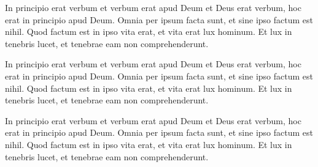 \documentclass{scrbook}
\begin{document}
\beginnumbering
\pstart
In principio erat verbum et verbum erat apud Deum et Deus erat verbum, hoc erat in principio apud Deum. Omnia per ipsum facta sunt, et sine ipso factum est nihil. Quod factum est in ipso vita erat, et vita erat lux hominum. Et lux in tenebris lucet, et tenebrae eam non comprehenderunt.
\pend

\pstart[\vskip \baselineskip{\hfill ***\hfill\strut}\vskip \baselineskip]
In principio erat verbum et verbum erat apud Deum et Deus erat verbum, hoc erat in principio apud Deum. Omnia per ipsum facta sunt, et sine ipso factum est nihil. Quod factum est in ipso vita erat, et vita erat lux hominum. Et lux in tenebris lucet, et tenebrae eam non comprehenderunt.
\pend

\pstart
In principio erat verbum et verbum erat apud Deum et Deus erat verbum, hoc erat in principio apud Deum. Omnia per ipsum facta sunt, et sine ipso factum est nihil. Quod factum est in ipso vita erat, et vita erat lux hominum. Et lux in tenebris lucet, et tenebrae eam non comprehenderunt.
\pend
\endnumbering
\end{document}
